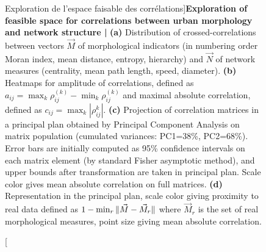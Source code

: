 \begin{figure}
{}
\subfloat[]{%
\vspace{-8.3cm}
}

\caption[Exploration of feasible space for correlations between urban morphology and network structure][Exploration de l'espace faisable des corrélations]{\footnotesize\textbf{Exploration of feasible space for correlations between urban morphology and network structure | } \textbf{(a)} Distribution of crossed-correlations between vectors $\vec{M}$ of morphological indicators (in numbering order Moran index, mean distance, entropy, hierarchy) and $\vec{N}$ of network measures (centrality, mean path length, speed, diameter). \textbf{(b)} Heatmaps for amplitude of correlations, defined as $a_{ij}=\max_k{\rho_{ij}^{(k)}}-\min_k{\rho_{ij}^{(k)}}$ and maximal absolute correlation, defined as $c_{ij}=\max_k\left| \rho_{ij}^{k} \right|$. \textbf{(c)} Projection of correlation matrices in a principal plan obtained by Principal Component Analysis on matrix population (cumulated variances: PC1=38\%, PC2=68\%). Error bars are initially computed as 95\% confidence intervals on each matrix element (by standard Fisher asymptotic method), and upper bounds after transformation are taken in principal plan. Scale color gives mean absolute correlation on full matrices. \textbf{(d)} Representation in the principal plan, scale color giving proximity to real data defined as $1 - \min_r \| \vec{M}-\vec{M}_r \|$ where $\vec{M}_r$ is the set of real morphological measures, point size giving mean absolute correlation.}{}
\label{fig:correlatedsyntheticdata:densnwcor}
\end{figure}


